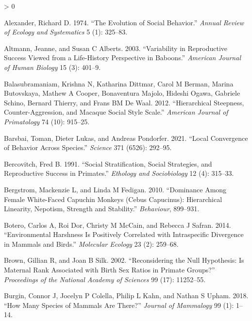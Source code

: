 \documentclass[
]{article}
\newlength{\cslhangindent}
\newenvironment{CSLReferences}[2] %
 {%
  \setlength{\parindent}{0pt}
  \ifodd #1 \everypar{\setlength{\hangindent}{\cslhangindent}}\ignorespaces\fi
  \ifnum #2 > 0
  \setlength{\parskip}{#2\baselineskip}
  \fi
 }%
 {}
\begin{document}
\hypertarget{refs}{}
\begin{CSLReferences}{1}{0}
\leavevmode\hypertarget{ref-alexander1974evolution}{}%
Alexander, Richard D. 1974. {``The Evolution of Social Behavior.''}
\emph{Annual Review of Ecology and Systematics} 5 (1): 325--83.

\leavevmode\hypertarget{ref-altmann2003variability}{}%
Altmann, Jeanne, and Susan C Alberts. 2003. {``Variability in
Reproductive Success Viewed from a Life-History Perspective in
Baboons.''} \emph{American Journal of Human Biology} 15 (3): 401--9.

\leavevmode\hypertarget{ref-balasubramaniam2012hierarchical}{}%
Balasubramaniam, Krishna N, Katharina Dittmar, Carol M Berman, Marina
Butovskaya, Mathew A Cooper, Bonaventura Majolo, Hideshi Ogawa, Gabriele
Schino, Bernard Thierry, and Frans BM De Waal. 2012. {``Hierarchical
Steepness, Counter-Aggression, and Macaque Social Style Scale.''}
\emph{American Journal of Primatology} 74 (10): 915--25.

\leavevmode\hypertarget{ref-barsbai2021local}{}%
Barsbai, Toman, Dieter Lukas, and Andreas Pondorfer. 2021. {``Local
Convergence of Behavior Across Species.''} \emph{Science} 371 (6526):
292--95.

\leavevmode\hypertarget{ref-bercovitch1991social}{}%
Bercovitch, Fred B. 1991. {``Social Stratification, Social Strategies,
and Reproductive Success in Primates.''} \emph{Ethology and
Sociobiology} 12 (4): 315--33.

\leavevmode\hypertarget{ref-bergstrom2010dominance}{}%
Bergstrom, Mackenzie L, and Linda M Fedigan. 2010. {``Dominance Among
Female White-Faced Capuchin Monkeys (Cebus Capucinus): Hierarchical
Linearity, Nepotism, Strength and Stability.''} \emph{Behaviour},
899--931.

\leavevmode\hypertarget{ref-botero2014environmental}{}%
Botero, Carlos A, Roi Dor, Christy M McCain, and Rebecca J Safran. 2014.
{``Environmental Harshness Is Positively Correlated with Intraspecific
Divergence in Mammals and Birds.''} \emph{Molecular Ecology} 23 (2):
259--68.

\leavevmode\hypertarget{ref-brown2002reconsidering}{}%
Brown, Gillian R, and Joan B Silk. 2002. {``Reconsidering the Null
Hypothesis: Is Maternal Rank Associated with Birth Sex Ratios in Primate
Groups?''} \emph{Proceedings of the National Academy of Sciences} 99
(17): 11252--55.

\leavevmode\hypertarget{ref-burgin2018many}{}%
Burgin, Connor J, Jocelyn P Colella, Philip L Kahn, and Nathan S Upham.
2018. {``How Many Species of Mammals Are There?''} \emph{Journal of
Mammalogy} 99 (1): 1--14.


\end{CSLReferences}
\end{document}
